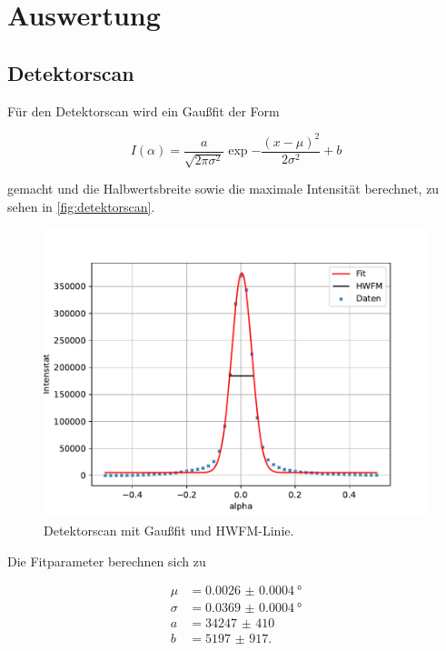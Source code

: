 \section{Auswertung}
\label{sec:Auswertung}

\subsection{Detektorscan}

Für den Detektorscan wird ein Gaußfit der Form

\begin{equation*}
    I(\alpha) = \frac{a}{\sqrt{2\pi\sigma^2}} \exp{-\frac{(x-\mu)^2}{2\sigma^2}} + b
\end{equation*}

gemacht und die Halbwertsbreite sowie die maximale Intensität berechnet, zu sehen in \autoref{fig:detektorscan}.

\begin{figure}[H]
    \centering
    \includegraphics[width=\textwidth]{plots/detectorscan.pdf}
    \caption{Detektorscan mit Gaußfit und HWFM-Linie.}
    \label{fig:detektorscan}
\end{figure}

Die Fitparameter berechnen sich zu

\begin{align*}
    \mu &= \qty{0.0026(4)}{\degree} \\
    \sigma &= \qty{0.0369(4)}{\degree} \\
    a &= \num{34247(410)} \\
    b &= \num{5197(917)}.
\end{align*}

